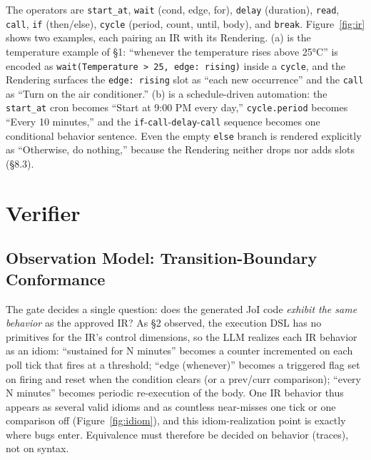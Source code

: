 \documentclass[sigconf,nonacm,anonymous,review]{acmart}
\begin{document}
The operators are \texttt{start\_at}, \texttt{wait} (cond, edge, for), \texttt{delay} (duration), \texttt{read}, \texttt{call}, \texttt{if} (then/else), \texttt{cycle} (period, count, until, body), and \texttt{break}. Figure~\ref{fig:ir} shows two examples, each pairing an IR with its Rendering. (a) is the temperature example of \S1: ``whenever the temperature rises above 25°C'' is encoded as \texttt{wait(Temperature > 25, edge: rising)} inside a \texttt{cycle}, and the Rendering surfaces the \texttt{edge: rising} slot as ``each new occurrence'' and the \texttt{call} as ``Turn on the air conditioner.'' (b) is a schedule-driven automation: the \texttt{start\_at} cron becomes ``Start at 9:00 PM every day,'' \texttt{cycle.period} becomes ``Every 10 minutes,'' and the \texttt{if}-\texttt{call}-\texttt{delay}-\texttt{call} sequence becomes one conditional behavior sentence. Even the empty \texttt{else} branch is rendered explicitly as ``Otherwise, do nothing,'' because the Rendering neither drops nor adds slots (\S8.3).

\section{Verifier}

\subsection{Observation Model: Transition-Boundary Conformance}

The gate decides a single question: does the generated JoI code \emph{exhibit the same behavior} as the approved IR? As \S2 observed, the execution DSL has no primitives for the IR's control dimensions, so the LLM realizes each IR behavior as an idiom: ``sustained for N minutes'' becomes a counter incremented on each poll tick that fires at a threshold; ``edge (whenever)'' becomes a triggered flag set on firing and reset when the condition clears (or a prev/curr comparison); ``every N minutes'' becomes periodic re-execution of the body. One IR behavior thus appears as several valid idioms and as countless near-misses one tick or one comparison off (Figure~\ref{fig:idiom}), and this idiom-realization point is exactly where bugs enter. Equivalence must therefore be decided on behavior (traces), not on syntax.
\end{document}
